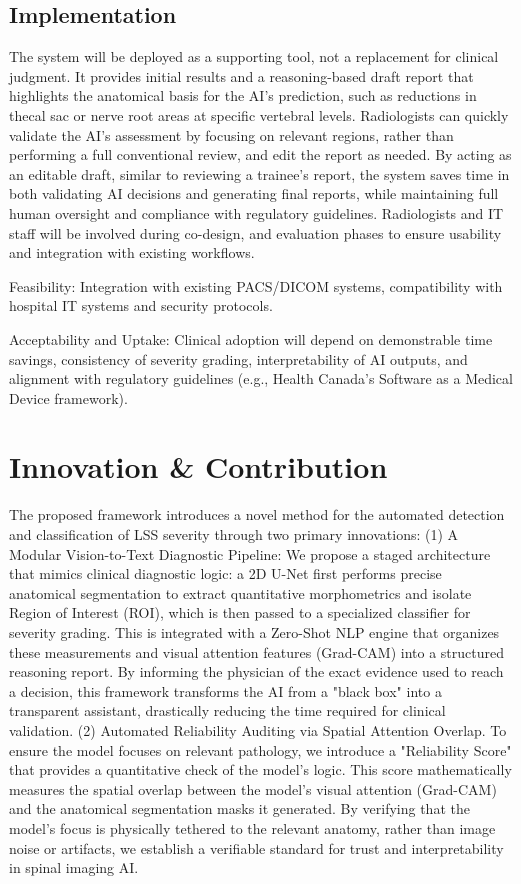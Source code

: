 \documentclass[12pt]{article}
\begin{document}
\subsection{Implementation}
The system will be deployed as a supporting tool, not a replacement for clinical judgment. It provides initial results and a reasoning-based draft report that highlights the anatomical basis for the AI’s prediction, such as reductions in thecal sac or nerve root areas at specific vertebral levels. Radiologists can quickly validate the AI’s assessment by focusing on relevant regions, rather than performing a full conventional review, and edit the report as needed. By acting as an editable draft, similar to reviewing a trainee’s report, the system saves time in both validating AI decisions and generating final reports, while maintaining full human oversight and compliance with regulatory guidelines.
Radiologists and IT staff will be involved during co-design, and evaluation phases to ensure usability and integration with existing workflows. 

Feasibility: Integration with existing PACS/DICOM systems, compatibility with hospital IT systems and security protocols.

Acceptability and Uptake: Clinical adoption will depend on demonstrable time savings, consistency of severity grading, interpretability of AI outputs, and alignment with regulatory guidelines (e.g., Health Canada’s Software as a Medical Device framework).


\section{Innovation \& Contribution}
The proposed framework introduces a novel method for the automated detection and classification of LSS severity through two primary innovations: (1) A Modular Vision-to-Text Diagnostic Pipeline: We propose a staged architecture that mimics clinical diagnostic logic: a 2D U-Net first performs precise anatomical segmentation to extract quantitative morphometrics and isolate Region of Interest (ROI), which is then passed to a specialized classifier for severity grading. This is integrated with a Zero-Shot NLP engine that organizes these measurements and visual attention features (Grad-CAM) into a structured reasoning report. By informing the physician of the exact evidence used to reach a decision, this framework transforms the AI from a "black box" into a transparent assistant, drastically reducing the time required for clinical validation. (2) Automated Reliability Auditing via Spatial Attention Overlap. To ensure the model focuses on relevant pathology, we introduce a "Reliability Score" that provides a quantitative check of the model's logic. This score mathematically measures the spatial overlap between the model’s visual attention (Grad-CAM) and the anatomical segmentation masks it generated. By verifying that the model's focus is physically tethered to the relevant anatomy, rather than image noise or artifacts, we establish a verifiable standard for trust and interpretability in spinal imaging AI.
\end{document}
